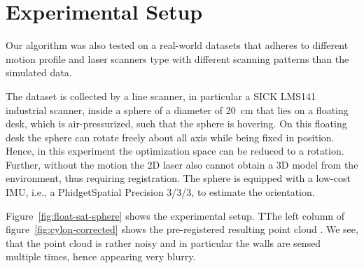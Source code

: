 \section{Experimental Setup}\label{sec:experimentalSetup}

Our algorithm was also tested on a real-world datasets that adheres to different motion profile and laser scanners type with different scanning patterns than the simulated data.  

The dataset is collected by a line scanner, in particular a SICK LMS141 industrial scanner, inside a sphere of a diameter of \SI{20}{\centi\meter} that lies on a floating desk, which is air-pressurized, such that the sphere is hovering.
On this floating desk the sphere can rotate freely about all axis while being fixed in position. 
Hence, in this experiment the optimization space can be reduced to a rotation.
Further, without the motion the 2D laser also cannot obtain a 3D model from the environment, thus requiring registration. 
The sphere is equipped with a low-cost IMU, i.e., a PhidgetSpatial Precision 3/3/3, to estimate the orientation. 

Figure~\ref{fig:float-sat-sphere} shows the experimental setup. TThe left column of figure~\ref{fig:cylon-corrected} shows the pre-registered resulting point cloud . 
We see, that the point cloud is rather noisy and in particular the walls are sensed multiple times, hence appearing very blurry. 

